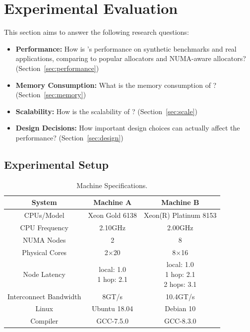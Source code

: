 \section{Experimental Evaluation}
\label{sec:evaluation}

This section aims to answer the following research questions: 

\begin{itemize}
\item \textbf{Performance:} How is \NM{}'s performance on synthetic benchmarks and real applications, comparing to popular allocators and NUMA-aware allocators? (Section~\ref{sec:performance}) 
\item \textbf{Memory Consumption:} What is the memory consumption of \NM{}? (Section~\ref{sec:memory})
\item \textbf{Scalability:} How is the scalability of \NM{}? (Section~\ref{sec:scale})
\item \textbf{Design Decisions:} How important design choices can actually affect the performance? (Section~\ref{sec:design})	
\end{itemize}

\subsection{Experimental Setup}

\begin{table}[h]
  \footnotesize
  \setlength{\tabcolsep}{1.0em}
\begin{tabular}{c c c}
\hline
System & \textbf{Machine A} & \textbf{Machine B} \\ \hline
CPUs/Model & Xeon Gold 6138	& Xeon(R) Platinum 8153\\ \hline
CPU Frequency & 2.10GHz & 2.00GHz\\ \hline
NUMA Nodes & 2 & 8 \\ \hline
Physical Cores & 2$\times$20 & 8$\times$16 \\ \hline
Node Latency & \specialcell{local: 1.0 \\ 1 hop: 2.1} & \specialcell{local: 1.0 \\ 1 hop: 2.1 \\ 2 hops: 3.1}\\ \hline
Interconnect Bandwidth & 8GT/s & 10.4GT/s\\ \hline
Linux & Ubuntu 18.04 & Debian 10\\ \hline
Compiler & GCC-7.5.0 & GCC-8.3.0 \\ \hline
  \end{tabular}
  \centering
  \caption{Machine Specifications.\label{table:Machine}}
\end{table}


